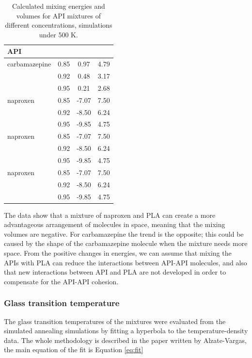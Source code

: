\begin{table}[htb]
	\caption{Calculated mixing energies and volumes for API mixtures of different concentrations, simulations under 500 K.}
	\centering
	\begin{tabular}{lSSS} \toprule
		{\textbf{API}} & {\textbf{}} & \textbf{{}} & \textbf{{}} \\
		\midrule
		carbamazepine  & 0.85 & 0.97 & 4.79 \\
		& 0.92 & 0.48 & 3.17 \\ 
		& 0.95   & 0.21 & 2.68    \\
		\midrule
		naproxen  & 0.85 & -7.07 & 7.50 \\
		& 0.92  & -8.50 & 6.24\\ 
		& 0.95   & -9.85 & 4.75   \\ 
		\midrule
		naproxen  & 0.85 & -7.07 & 7.50 \\
		& 0.92  & -8.50 & 6.24\\ 
		& 0.95   & -9.85 & 4.75   \\ 
		\midrule
		naproxen  & 0.85 & -7.07 & 7.50 \\
		& 0.92  & -8.50 & 6.24\\ 
		& 0.95   & -9.85 & 4.75   \\ 
		\bottomrule
	\end{tabular}
	\label{tab:vobjemy} 
\end{table}

The data show that a mixture of naproxen and PLA can create a more advantageous arrangement of molecules in space, meaning that the mixing volumes are negative. For carbamazepine the trend is the opposite; this could be caused by the shape of the carbamazepine molecule when the mixture needs more space. From the positive changes in energies, we can assume that mixing the APIs with PLA can reduce the interactions between API-API molecules, and also that new interactions between API and PLA are not developed in order to compensate for the API-API cohesion. 

\subsubsection{Glass transition temperature}
The glass transition temperatures of the mixtures were evaluated from the simulated annealing simulations by fitting a hyperbola to the temperature-density data. The whole methodology is described in the paper written by Alzate-Vargas\cite{alzate-vargas_uncertainties_2018}, the main equation of the fit is Equation \ref{eq:fit}

